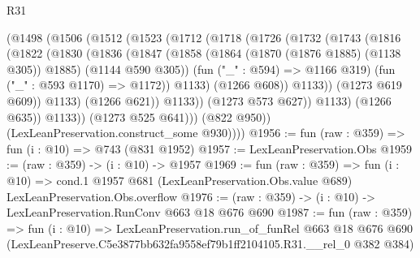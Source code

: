 \begin{lexlean}{R31}
\begin{coremodule}
                  (@1498
                    (@1506
                      (@1512
                        (@1523
                          (@1712
                            (@1718
                              (@1726
                                (@1732
                                  (@1743
                                    (@1816
                                      (@1822
                                        (@1830
                                          (@1836
                                            (@1847
                                              (@1858
                                                (@1864 (@1870 (@1876 @1885) (@1138 @305)) @1885)
                                                (@1144 @590 @305))
                                              (fun ("_" : @594) => @1166 @319)
                                              (fun ("_" : @593 @1170) => @1172))
                                            @1133)
                                          (@1266 @608))
                                        @1133))
                                    (@1273 @619 @609))
                                  @1133)
                                (@1266 @621))
                              @1133))
                          (@1273 @573 @627))
                        @1133)
                      (@1266 @635))
                    @1133))
                (@1273 @525 @641)))
            (@822 @950))
          (LexLeanPreservation.construct_some @930))))
@1956 := fun (raw : @359) => fun (i : @10) => @743 (@831 @1952)
@1957 := LexLeanPreservation.Obs
@1959 := (raw : @359) -> (i : @10) -> @1957
@1969 := fun (raw : @359) =>
  fun (i : @10) =>
  cond.{1} @1957 @681 (LexLeanPreservation.Obs.value @689) LexLeanPreservation.Obs.overflow
@1976 := (raw : @359) -> (i : @10) -> LexLeanPreservation.RunConv @663 @18 @676 @690
@1987 := fun (raw : @359) =>
  fun (i : @10) =>
  LexLeanPreservation.run_of_funRel
    @663
    @18
    @676
    @690
    (LexLeanPreserve.C5e3877bb632fa9558ef79b1ff2104105.R31.__rel_0 @382 @384)
\end{coremodule}
\end{lexlean}
